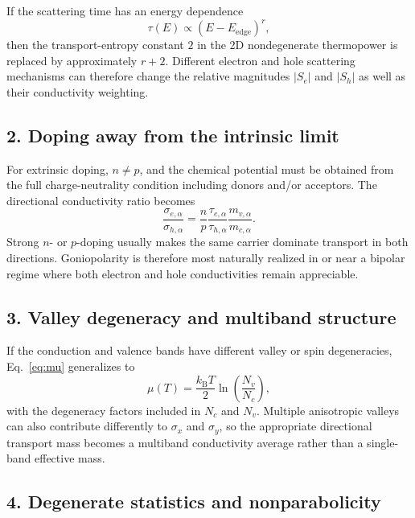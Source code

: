 \documentclass[11pt]{article}
\newcommand{\kb}{k_{\mathrm B}}
\begin{document}
If the scattering time has an energy dependence
\begin{equation}
\tau(E)\propto(E-E_{\mathrm{edge}})^r,
\end{equation}
then the transport-entropy constant $2$ in the 2D nondegenerate thermopower is replaced by approximately $r+2$. Different electron and hole scattering mechanisms can therefore change the relative magnitudes $|S_e|$ and $|S_h|$ as well as their conductivity weighting.

\subsection*{2. Doping away from the intrinsic limit}

For extrinsic doping, $n\neq p$, and the chemical potential must be obtained from the full charge-neutrality condition including donors and/or acceptors. The directional conductivity ratio becomes
\begin{equation}
\frac{\sigma_{e,\alpha}}{\sigma_{h,\alpha}}
=
\frac{n}{p}
\frac{\tau_{e,\alpha}}{\tau_{h,\alpha}}
\frac{m_{v,\alpha}}{m_{c,\alpha}}.
\end{equation}
Strong $n$- or $p$-doping usually makes the same carrier dominate transport in both directions. Goniopolarity is therefore most naturally realized in or near a bipolar regime where both electron and hole conductivities remain appreciable.

\subsection*{3. Valley degeneracy and multiband structure}

If the conduction and valence bands have different valley or spin degeneracies, Eq.~\eqref{eq:mu} generalizes to
\begin{equation}
\mu(T)
=\frac{\kb T}{2}\ln\!\left(\frac{N_v}{N_c}\right),
\end{equation}
with the degeneracy factors included in $N_c$ and $N_v$. Multiple anisotropic valleys can also contribute differently to $\sigma_x$ and $\sigma_y$, so the appropriate directional transport mass becomes a multiband conductivity average rather than a single-band effective mass.

\subsection*{4. Degenerate statistics and nonparabolicity}
\end{document}
